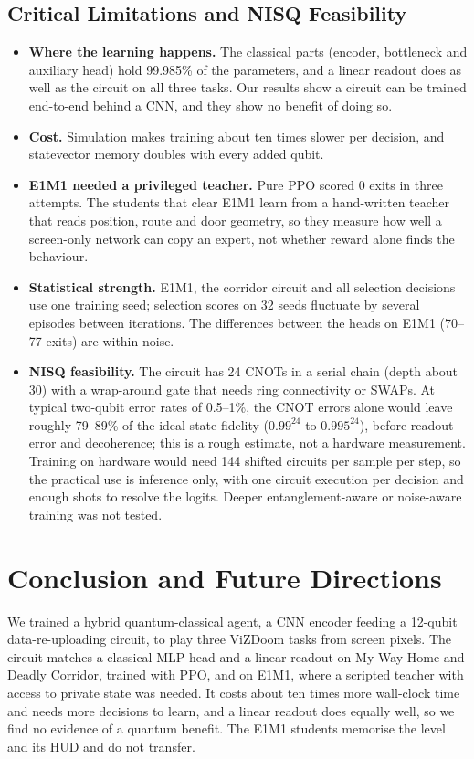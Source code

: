 \documentclass[10pt, a4paper]{article}
\begin{document}
\subsection{Critical Limitations and NISQ Feasibility}
\begin{itemize}
    \item \textbf{Where the learning happens.} The classical parts (encoder, bottleneck and auxiliary head) hold 99.985\% of the parameters, and a linear readout does as well as the circuit on all three tasks. Our results show a circuit can be trained end-to-end behind a CNN, and they show no benefit of doing so.
    \item \textbf{Cost.} Simulation makes training about ten times slower per decision, and statevector memory doubles with every added qubit.
    \item \textbf{E1M1 needed a privileged teacher.} Pure PPO scored 0 exits in three attempts. The students that clear E1M1 learn from a hand-written teacher that reads position, route and door geometry, so they measure how well a screen-only network can copy an expert, not whether reward alone finds the behaviour.
    \item \textbf{Statistical strength.} E1M1, the corridor circuit and all selection decisions use one training seed; selection scores on 32 seeds fluctuate by several episodes between iterations. The differences between the heads on E1M1 (70--77 exits) are within noise.
    \item \textbf{NISQ feasibility.} The circuit has 24 CNOTs in a serial chain (depth about 30) with a wrap-around gate that needs ring connectivity or SWAPs. At typical two-qubit error rates of 0.5--1\%, the CNOT errors alone would leave roughly 79--89\% of the ideal state fidelity ($0.99^{24}$ to $0.995^{24}$), before readout error and decoherence; this is a rough estimate, not a hardware measurement. Training on hardware would need 144 shifted circuits per sample per step, so the practical use is inference only, with one circuit execution per decision and enough shots to resolve the logits. Deeper entanglement-aware or noise-aware training was not tested.
\end{itemize}

\section{Conclusion and Future Directions}
\label{sec:conclusion}
We trained a hybrid quantum-classical agent, a CNN encoder feeding a 12-qubit data-re-uploading circuit, to play three ViZDoom tasks from screen pixels. The circuit matches a classical MLP head and a linear readout on My Way Home and Deadly Corridor, trained with PPO, and on E1M1, where a scripted teacher with access to private state was needed. It costs about ten times more wall-clock time and needs more decisions to learn, and a linear readout does equally well, so we find no evidence of a quantum benefit. The E1M1 students memorise the level and its HUD and do not transfer.
\end{document}
